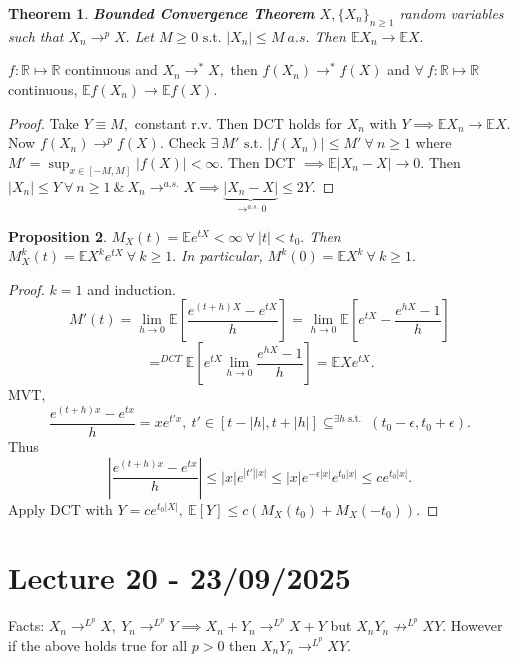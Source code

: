 \documentclass{article}
\newcommand{\1}{\mathds{1}}
\newcommand{\R}{\mathbb{R}}
\newcommand{\E}{\mathbb{E}}
\newcommand{\lf}{\left}
\newcommand{\rg}{\right}
\newcommand{\f}[2]{\frac{#1}{#2}}
\newcommand{\st}{\text{ s.t. }}
\newcommand{\tb}[1]{\lf[#1\rg]}
\newcommand{\card}[1]{\lf\vert #1\rg\vert}
\newcommand{\ar}{\ \&\ }
\newtheorem{theorem}{Theorem}[section]
\newtheorem{proposition}[theorem]{Proposition}
\begin{document}
\begin{theorem}\textbf{Bounded Convergence Theorem}
$X,\{X_n\}_{n\geq 1}$ random variables such that $X_n\to^p X.$ Let $M\geq 0\st \card{X_n}\leq M\ a.s.$ Then $\E X_n\to \E X.$
\end{theorem}
$f:\R\mapsto\R$ continuous and $X_n\to^* X,$ then $f(X_n)\to^* f(X)$ and $\forall\ f:\R\mapsto\R$ continuous, $\E f(X_n)\to\E f(X).$
\begin{proof}
    Take $Y\equiv M,$ constant r.v. Then DCT holds for $X_n$ with $Y\implies \E X_n\to\E X.$ Now $f(X_n)\to^p f(X).$ Check $\exists\ M'\st\card{f(X_n)}\leq M'\ \forall\ n\geq 1$ where $M'=\sup_{x\in [-M,M]}\card{f(X)}<\infty.$
    Then DCT $\implies\E\card{X_n-X}\to 0.$ Then $\card{X_n}\leq Y\ \forall\ n\geq 1\ar X_n\to^{a.s.} X\implies \underbrace{\card{X_n-X}}_{\to^{a.s.} 0}\leq 2Y.$
\end{proof}
\begin{proposition}
    $M_X(t)=\E e^{tX}<\infty\ \forall\ \card{t}<t_0.$ Then $M_X^k(t)=\E X^ke^{tX}\ \forall\ k\ge 1.$ In particular, $M^k(0)=\E X^k\ \forall\ k\geq 1.$
\end{proposition}
\begin{proof}
    $k=1$ and induction. $$M'(t)=\lim_{h\to 0}\E\tb{\f{e^{(t+h)X}-e^{tX}}h}=\lim_{h\to 0}\E\tb{e^{tX}-\f{e^{hX}-1}h}$$ $$=^{DCT}\E\tb{e^{tX}\lim_{h\to 0}\f{e^{hX}-1}h}=\E Xe^{tX}.$$ MVT, $$\f{e^{(t+h)x}-e^{tx}}h=xe^{t'x},\ t'\in [t-\card{h},t+\card{h}]\subseteq^{\exists h\st}(t_0-\epsilon,t_0+\epsilon).$$ Thus $$\card{\f{e^{(t+h)x}-e^{tx}}h}\leq \card{x}e^{\card{t'}\card{x}}\leq \card{x}e^{-\epsilon\card{x}}e^{t_0\card{x}}\leq ce^{t_0\card{x}}.$$ Apply DCT with $Y=ce^{t_0\card{X}},\ \E[Y]\leq c(M_X(t_0)+M_X(-t_0)).$
\end{proof}
\section{Lecture 20 - 23/09/2025}
Facts: $X_n\to^{L^p} X,\ Y_n\to^{L^p} Y \implies X_n+Y_n\to^{L^p} X+Y$ but $X_nY_n\not\to^{L^p} XY.$ However if the above holds true for all $p>0$ then $X_nY_n\to^{L^p} XY.$
\end{document}
